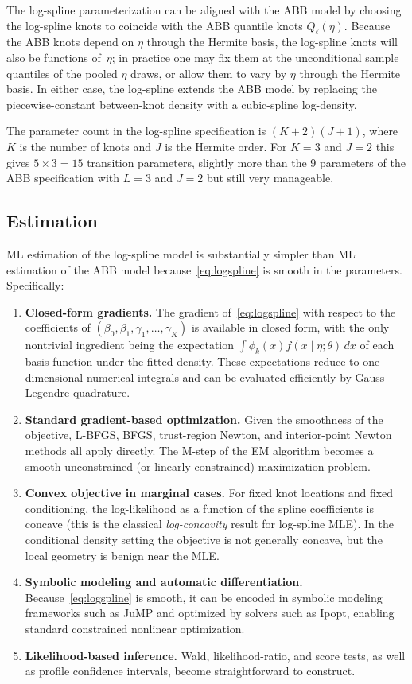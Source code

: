\documentclass[12pt]{article}
\begin{document}
The log-spline parameterization can be aligned with the ABB model by choosing the log-spline knots to coincide with the ABB quantile knots $Q_{\ell}(\eta)$. Because the ABB knots depend on $\eta$ through the Hermite basis, the log-spline knots will also be functions of~$\eta$; in practice one may fix them at the unconditional sample quantiles of the pooled $\eta$ draws, or allow them to vary by $\eta$ through the Hermite basis. In either case, the log-spline extends the ABB model by replacing the piecewise-constant between-knot density with a cubic-spline log-density.

The parameter count in the log-spline specification is $(K+2)(J+1)$, where $K$ is the number of knots and $J$ is the Hermite order. For $K = 3$ and $J = 2$ this gives $5 \times 3 = 15$ transition parameters, slightly more than the 9 parameters of the ABB specification with $L = 3$ and $J = 2$ but still very manageable.

\subsection{Estimation}

ML estimation of the log-spline model is substantially simpler than ML estimation of the ABB model because~\eqref{eq:logspline} is smooth in the parameters. Specifically:

\begin{enumerate}
\item \textbf{Closed-form gradients.} The gradient of~\eqref{eq:logspline} with respect to the coefficients of $(\beta_{0}, \beta_{1}, \gamma_{1}, \dots, \gamma_{K})$ is available in closed form, with the only nontrivial ingredient being the expectation $\int \phi_{k}(x) f(x \mid \eta; \theta)\, dx$ of each basis function under the fitted density. These expectations reduce to one-dimensional numerical integrals and can be evaluated efficiently by Gauss--Legendre quadrature.
\item \textbf{Standard gradient-based optimization.} Given the smoothness of the objective, L-BFGS, BFGS, trust-region Newton, and interior-point Newton methods all apply directly. The M-step of the EM algorithm becomes a smooth unconstrained (or linearly constrained) maximization problem.
\item \textbf{Convex objective in marginal cases.} For fixed knot locations and fixed conditioning, the log-likelihood as a function of the spline coefficients is concave (this is the classical \emph{log-concavity} result for log-spline MLE). In the conditional density setting the objective is not generally concave, but the local geometry is benign near the MLE.
\item \textbf{Symbolic modeling and automatic differentiation.} Because~\eqref{eq:logspline} is smooth, it can be encoded in symbolic modeling frameworks such as JuMP and optimized by solvers such as Ipopt, enabling standard constrained nonlinear optimization.
\item \textbf{Likelihood-based inference.} Wald, likelihood-ratio, and score tests, as well as profile confidence intervals, become straightforward to construct.
\end{enumerate}
\end{document}
